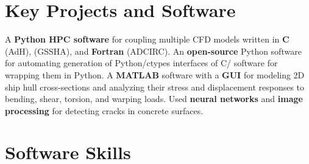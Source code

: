 \documentclass[letterpaper,11pt]{article}
\begin{document}



  \resumeSubHeadingListEnd

\section{Key Projects and Software}
  \resumeSubHeadingListStart
      {A \textbf{Python HPC software} for coupling multiple CFD
      models written in \textbf{C} (AdH), \textbf{\CC{}} (GSSHA), and
      \textbf{Fortran} (ADCIRC).}
      {An \textbf{open-source} Python software for automating
      generation of Python/ctypes interfaces of C/\CC{} software for wrapping
      them in Python.}
      {A \textbf{MATLAB} software with a \textbf{GUI} for modeling 2D
      ship hull cross-sections and analyzing their stress and displacement
      responses to bending, shear, torsion, and warping loads.}
      {Used \textbf{neural networks} and \textbf{image processing} for detecting
      cracks in concrete surfaces.}
  \resumeSubHeadingListEnd

\section{Software Skills}
  \resumeSubHeadingListStart
  \resumeSubHeadingListEnd
\end{document}
